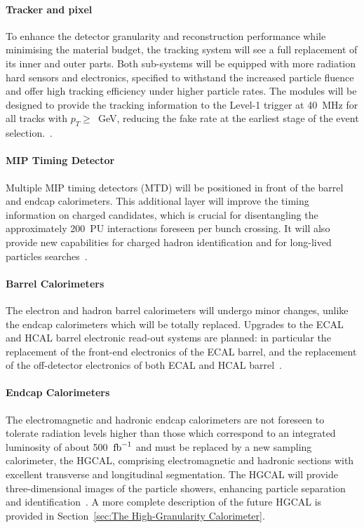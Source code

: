 \paragraph{Tracker and pixel}
To enhance the detector granularity and reconstruction performance while minimising the material budget, the tracking system will see a full replacement of its inner and outer parts. Both sub-systems will be equipped with more radiation hard sensors and electronics, specified to withstand the increased particle fluence and offer high tracking efficiency under higher particle rates.
The modules will be designed to provide the tracking information to the Level-1 trigger at 40~MHz for all tracks with $p_T\geq$~GeV, reducing the fake rate at the earliest stage of the event selection.~\cite{CERN-LHCC-2017-009}.

\paragraph{MIP Timing Detector}
Multiple MIP timing detectors (MTD) will be positioned in front of the barrel and endcap calorimeters. This additional layer will improve the timing information on charged candidates, which is crucial for disentangling the approximately 200~PU interactions foreseen per bunch crossing. It will also provide new capabilities for charged hadron identification and for long-lived particles searches~\cite{CMS:2667167}.

\paragraph{Barrel Calorimeters}
The electron and hadron barrel calorimeters will undergo minor changes, unlike the endcap calorimeters which will be totally replaced.
Upgrades to the ECAL and HCAL barrel electronic read-out systems are planned: in particular the replacement of the front-end electronics of the ECAL barrel, and the replacement of the off-detector electronics of both ECAL and HCAL barrel~\cite{CERN-LHCC-2017-011}.

\paragraph{Endcap Calorimeters}
The electromagnetic and hadronic endcap calorimeters are not foreseen to tolerate radiation levels higher than those which correspond to an integrated luminosity of about 500~$\textnormal{fb}^{-1}$ and must be replaced by a new sampling calorimeter, the HGCAL, comprising electromagnetic and hadronic sections with excellent transverse and longitudinal segmentation. The HGCAL will provide three-dimensional images of the particle showers, enhancing particle separation and identification~\cite{CERN-LHCC-2017-023}. A more complete description of the future HGCAL is provided in Section~\ref{sec:The High-Granularity Calorimeter}.

